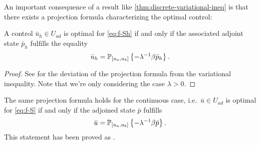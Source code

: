 \documentclass[../thesis.tex]{subfiles}
\begin{document}
An important consequence of a result like \cref{thm:discrete-variational-ineq} is that there exists a projection formula characterizing the optimal control:
\begin{theorem}
A control $\bar{u}_h \in U_{ad}$ is optimal for \cref{eq:f-Sh} if and only if the associated adjoint state $\bar{p}_h$ fulfills the equality
\[
	\bar{u}_h = \mathbb{P}_{[u_a, u_b]} \left\{ - \lambda^{-1} \beta \bar{p}_h \right\}.
\]
\end{theorem}
\begin{proof}
See \cite[p.\ 53ff.]{Troeltzsch} for the deviation of the projection formula from the variational inequality.
Note that we're only considering the case $\lambda > 0$.
\end{proof}
The same projection formula holds for the continuous case, i.e.\ $\bar{u} \in U_{ad}$ is optimal for \cref{eq:f-S} if and only if the adjoined state $\bar{p}$ fulfills
\[
	\bar{u} = \mathbb{P}_{[u_a, u_b]} \left\{ - \lambda^{-1} \beta \bar{p} \right\}.
\]
This statement has been proved as \cite[Satz 3.20]{Troeltzsch}.
\end{document}
